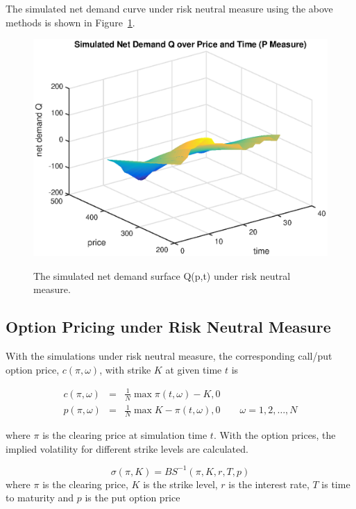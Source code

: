 \documentclass{article}
\begin{document}
The simulated net demand curve under risk neutral measure using the above methods is shown in Figure~\ref{fig::AAPL_20110401_simulated_Q_P_measure}.

\begin{center}
\begin{figure}
  \centering
  \includegraphics[scale = 0.5]{Simulated_Q_P_Measure.eps}\\
  \caption{The simulated net demand surface Q(p,t) under risk neutral measure.}\label{fig::AAPL_20110401_simulated_Q_P_measure}
\end{figure}
\end{center}

\newpage
\subsection{Option Pricing under Risk Neutral Measure}
With the simulations under risk neutral measure, the corresponding call/put option price, $c(\pi, \omega)$, with strike $K$ at given time $t$ is

\begin{eqnarray*}
c(\pi, \omega) &=& \frac{1}{N} \max{\pi(t,\omega)-K,0} \\
p(\pi, \omega) &=& \frac{1}{N} \max{K - \pi(t,\omega),0} \qquad \omega = 1,2,\ldots,N
\end{eqnarray*}

where $\pi$ is the clearing price at simulation time $t$. With the option prices, the implied volatility for different strike levels are calculated.

$$
\sigma(\pi, K) = BS^{-1}(\pi,K,r,T,p)
$$
where $\pi$ is the clearing price, $K$ is the strike level, $r$ is the interest rate, $T$ is time to maturity and $p$ is the put option price
\end{document}
